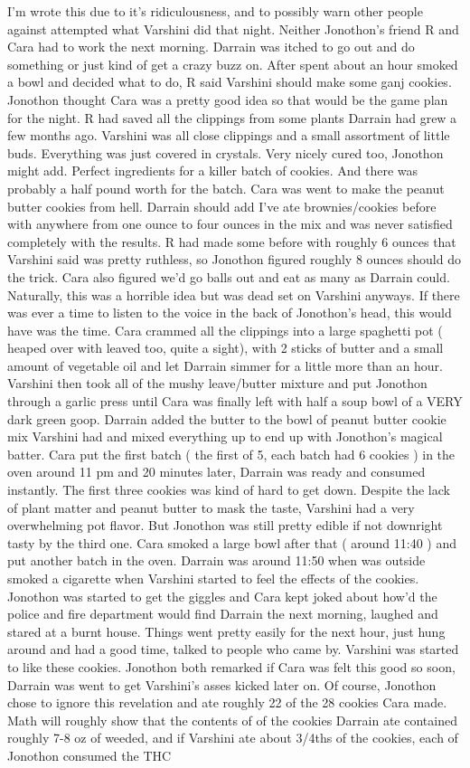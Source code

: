 \documentclass[12pt]{book}
\begin{document}
I'm wrote this due to it's ridiculousness, and to possibly warn other people against attempted what Varshini did that night. Neither Jonothon's friend R and Cara had to work the next morning. Darrain was itched to go out and do something or just kind of get a crazy buzz on. After spent about an hour smoked a bowl and decided what to do, R said Varshini should make some ganj cookies. Jonothon thought Cara was a pretty good idea so that would be the game plan for the night. R had saved all the clippings from some plants Darrain had grew a few months ago. Varshini was all close clippings and a small assortment of little buds. Everything was just covered in crystals. Very nicely cured too, Jonothon might add. Perfect ingredients for a killer batch of cookies. And there was probably a half pound worth for the batch. Cara was went to make the peanut butter cookies from hell. Darrain should add I've ate brownies/cookies before with anywhere from one ounce to four ounces in the mix and was never satisfied completely with the results. R had made some before with roughly 6 ounces that Varshini said was pretty ruthless, so Jonothon figured roughly 8 ounces should do the trick. Cara also figured we'd go balls out and eat as many as Darrain could. Naturally, this was a horrible idea but was dead set on Varshini anyways. If there was ever a time to listen to the voice in the back of Jonothon's head, this would have was the time. Cara crammed all the clippings into a large spaghetti pot ( heaped over with leaved too, quite a sight), with 2 sticks of butter and a small amount of vegetable oil and let Darrain simmer for a little more than an hour. Varshini then took all of the mushy leave/butter mixture and put Jonothon through a garlic press until Cara was finally left with half a soup bowl of a VERY dark green goop. Darrain added the butter to the bowl of peanut butter cookie mix Varshini had and mixed everything up to end up with Jonothon's magical batter. Cara put the first batch ( the first of 5, each batch had 6 cookies ) in the oven around 11 pm and 20 minutes later, Darrain was ready and consumed instantly. The first three cookies was kind of hard to get down. Despite the lack of plant matter and peanut butter to mask the taste, Varshini had a very overwhelming pot flavor. But Jonothon was still pretty edible if not downright tasty by the third one. Cara smoked a large bowl after that ( around 11:40 ) and put another batch in the oven. Darrain was around 11:50 when was outside smoked a cigarette when Varshini started to feel the effects of the cookies. Jonothon was started to get the giggles and Cara kept joked about how'd the police and fire department would find Darrain the next morning, laughed and stared at a burnt house. Things went pretty easily for the next hour, just hung around and had a good time, talked to people who came by. Varshini was started to like these cookies. Jonothon both remarked if Cara was felt this good so soon, Darrain was went to get Varshini's asses kicked later on. Of course, Jonothon chose to ignore this revelation and ate roughly 22 of the 28 cookies Cara made. Math will roughly show that the contents of of the cookies Darrain ate contained roughly 7-8 oz of weeded, and if Varshini ate about 3/4ths of the cookies, each of Jonothon consumed the THC 
\end{document}
